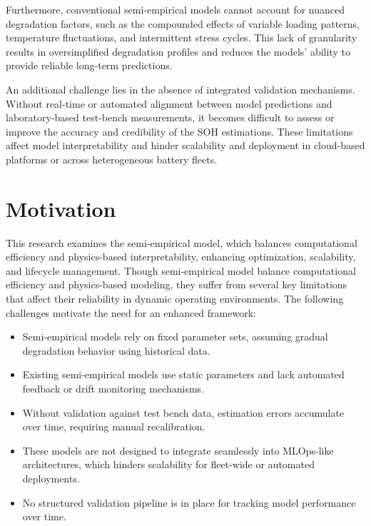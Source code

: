 Furthermore, conventional semi-empirical models cannot account for nuanced degradation factors, such as the compounded effects of variable loading patterns, temperature fluctuations, and intermittent stress cycles. This lack of granularity results in oversimplified degradation profiles and reduces the models' ability to provide reliable long-term predictions.

An additional challenge lies in the absence of integrated validation mechanisms. Without real-time or automated alignment between model predictions and laboratory-based test-bench measurements, it becomes difficult to assess or improve the accuracy and credibility of the SOH estimations. These limitations affect model interpretability and hinder scalability and deployment in cloud-based platforms or across heterogeneous battery fleets.


\section{Motivation}
This research examines the semi-empirical model, which balances computational efficiency and physics-based interpretability, enhancing optimization, scalability, and lifecycle management. Though semi-empirical model balance computational efficiency and physics-based modeling, they suffer from several key limitations that affect their reliability in dynamic operating environments. The following challenges motivate the need for an enhanced framework:
\begin{itemize}
    \item Semi-empirical models rely on fixed parameter sets, assuming gradual degradation behavior using historical data.
    \item Existing semi-empirical models use static parameters and lack automated feedback or drift monitoring mechanisms.
    \item Without validation against test bench data, estimation errors accumulate over time, requiring manual recalibration.
    \item These models are not designed to integrate seamlessly into MLOps-like architectures, which hinders scalability for fleet-wide or automated deployments.
    \item No structured validation pipeline is in place for tracking model performance over time.
\end{itemize}

